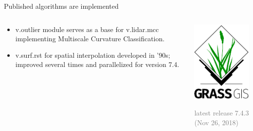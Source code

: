 \documentclass[xcolor={dvipsnames,usenames},beamer,aspectratio=169]{beamer}
\begin{document}
\begin{frame}{Published algorithms are implemented}

\begin{columns}
\begin{column}{0.6\textwidth}

\begin{itemize}
  \item v.outlier module serves as a base for v.lidar.mcc implementing Multiscale Curvature Classification.
  \item v.surf.rst for spatial interpolation developed in ’90s; improved several times and parallelized for version 7.4.
\end{itemize}

\end{column}
\begin{column}{0.3\textwidth}

\begin{center}
  \includegraphics[width=\textwidth]{logos/grass_gis}
\end{center}

\vspace*{-1ex}

\textcolor{gray}{
\footnotesize
latest release 7.4.3
\scriptsize
(Nov 26, 2018)
}

\end{column}
\end{columns}

\end{frame}
\end{document}
